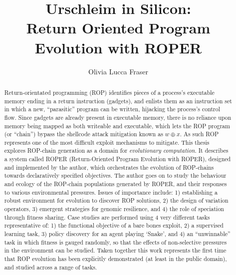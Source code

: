 \title{Urschleim in Silicon:\\Return Oriented Program\\Evolution with ROPER}
\author{Olivia Lucca Fraser}

\mcs
{}

\frontmatter

\begin{abstract}
Return-orientated programming (ROP) identifies pieces of a process's
executable memory ending in a return instruction (gadgets), and enlists them as
an instruction set in which a new, ``parasitic'' program can be written,
hijacking the process's control flow. Since gadgets are already present in
executable memory, there is no reliance upon memory being mapped as both
writeable and executable, which lets the ROP program (or ``chain'') bypass the
shellcode attack mitigation known as $w\oplus x$. As such ROP represents one of
the most difficult exploit mechanisms to mitigate. This thesis explores
ROP-chain generation as a domain for \emph{evolutionary computation}. It
describes a system called ROPER (Return-Oriented Program Evolution with ROPER),
designed and implemented by the author, which orchestrates the evolution of
ROP-chains towards declaratively specified objectives. The author goes on to
study the behaviour and ecology of the ROP-chain populations generated by ROPER,
and their responses to various environmental pressures.
Issues of importance include: 1) establishing a robust environment for evolution
to discover ROP solutions, 2) the design of variation operators, 3) emergent
strategies for genomic resilience, and 4) the role
of speciation through fitness sharing. Case studies are performed using 4 very
different tasks representative of: 1) the functional objective of a bare bones
exploit, 2) a supervised learning task, 3) policy discovery for an agent playing
‘Snake’, and 4) an ``unwinnable'' task in which fitness is gauged randomly, so
that the effects of non-selective pressures in the environment can be studied.
Taken together this work represents the first time that ROP evolution has been
explicitly demonstrated (at least in the public domain), and studied across
a range of tasks.
\end{abstract}

